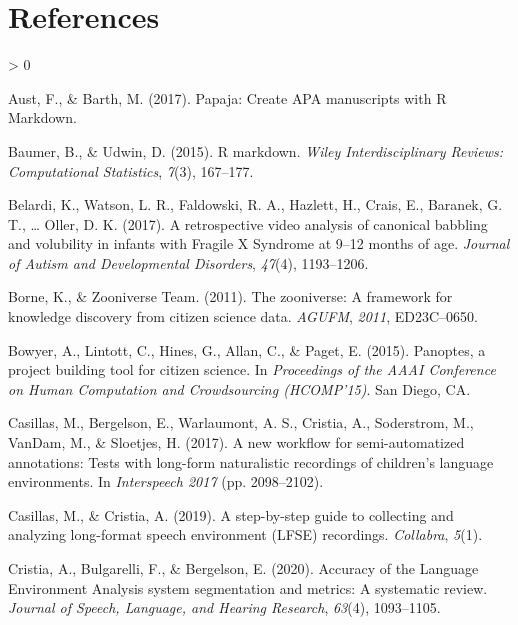 \documentclass[
  english,
  ,man]{apa6}
\newlength{\cslhangindent}
\newenvironment{CSLReferences}[2] %
 {%
  \setlength{\parindent}{0pt}
  \ifodd #1 \everypar{\setlength{\hangindent}{\cslhangindent}}\ignorespaces\fi
  \ifnum #2 > 0
  \setlength{\parskip}{#2\baselineskip}
  \fi
 }%
 {}
\begin{document}
\hypertarget{references}{%
\section{References}\label{references}}

\setlength{\parindent}{-0.5in}
\setlength{\leftskip}{0.5in}

\hypertarget{refs}{}
\begin{CSLReferences}{1}{0}
\leavevmode\hypertarget{ref-aust2017papaja}{}%
Aust, F., \& Barth, M. (2017). Papaja: Create {APA manuscripts with R Markdown}.

\leavevmode\hypertarget{ref-baumer2015r}{}%
Baumer, B., \& Udwin, D. (2015). R markdown. \emph{Wiley Interdisciplinary Reviews: Computational Statistics}, \emph{7}(3), 167--177.

\leavevmode\hypertarget{ref-belardi2017retrospective}{}%
Belardi, K., Watson, L. R., Faldowski, R. A., Hazlett, H., Crais, E., Baranek, G. T., \ldots{} Oller, D. K. (2017). A retrospective video analysis of canonical babbling and volubility in infants with {Fragile X Syndrome} at 9--12 months of age. \emph{Journal of Autism and Developmental Disorders}, \emph{47}(4), 1193--1206.

\leavevmode\hypertarget{ref-borne2011zooniverse}{}%
Borne, K., \& Zooniverse Team. (2011). The zooniverse: A framework for knowledge discovery from citizen science data. \emph{AGUFM}, \emph{2011}, ED23C--0650.

\leavevmode\hypertarget{ref-bowyer2015panoptes}{}%
Bowyer, A., Lintott, C., Hines, G., Allan, C., \& Paget, E. (2015). Panoptes, a project building tool for citizen science. In \emph{{Proceedings of the AAAI Conference on Human Computation and Crowdsourcing (HCOMP'15)}}. San Diego, CA.

\leavevmode\hypertarget{ref-casillas2017new}{}%
Casillas, M., Bergelson, E., Warlaumont, A. S., Cristia, A., Soderstrom, M., VanDam, M., \& Sloetjes, H. (2017). A new workflow for semi-automatized annotations: Tests with long-form naturalistic recordings of children's language environments. In \emph{Interspeech 2017} (pp. 2098--2102).

\leavevmode\hypertarget{ref-casillas2019step}{}%
Casillas, M., \& Cristia, A. (2019). A step-by-step guide to collecting and analyzing long-format speech environment ({LFSE}) recordings. \emph{Collabra}, \emph{5}(1).

\leavevmode\hypertarget{ref-cristia2020accuracy}{}%
Cristia, A., Bulgarelli, F., \& Bergelson, E. (2020). Accuracy of the {Language Environment Analysis} system segmentation and metrics: A systematic review. \emph{Journal of Speech, Language, and Hearing Research}, \emph{63}(4), 1093--1105.


\end{CSLReferences}
\end{document}
